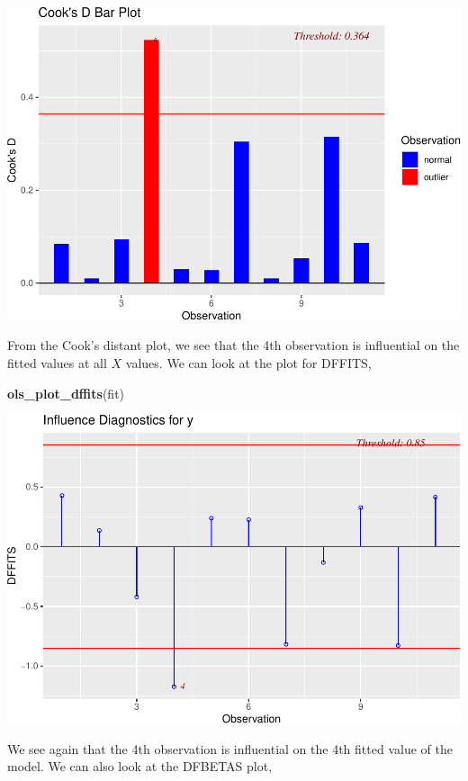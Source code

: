 \documentclass[
  11pt,
]{article}
\newenvironment{Shaded}{\begin{snugshade}}{\end{snugshade}}
\newcommand{\FunctionTok}[1]{\textcolor[rgb]{0.13,0.29,0.53}{\textbf{#1}}}
\newcommand{\NormalTok}[1]{#1}
\begin{document}
\includegraphics{examples_files/figure-latex/unnamed-chunk-37-1.pdf}

From the Cook's distant plot, we see that the 4th observation is
influential on the fitted values at all \(X\) values. We can look at the
plot for DFFITS,

\begin{Shaded}
\begin{Highlighting}[]
\FunctionTok{ols\_plot\_dffits}\NormalTok{(fit)}
\end{Highlighting}
\end{Shaded}

\includegraphics{examples_files/figure-latex/unnamed-chunk-38-1.pdf}

We see again that the 4th observation is influential on the 4th fitted
value of the model. We can also look at the DFBETAS plot,
\end{document}
